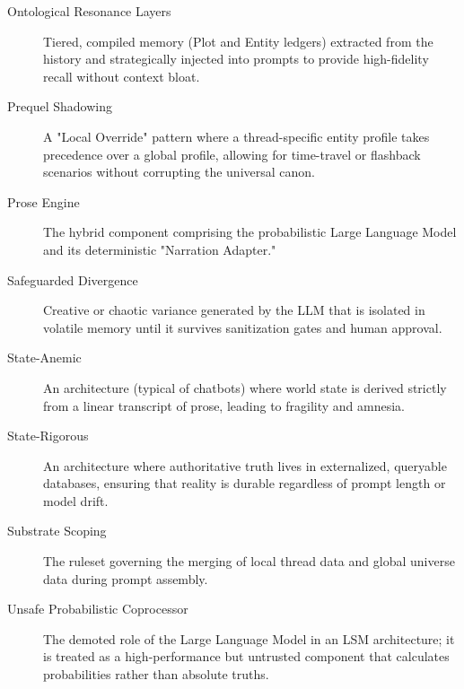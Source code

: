 \documentclass[12pt, a4paper]{article}
\begin{document}
\begin{description}
    \item[Ontological Resonance Layers] \label{def:resonance}
    Tiered, compiled memory (Plot and Entity ledgers) extracted from the history and strategically injected into prompts to provide high-fidelity recall without context bloat.

    \item[Prequel Shadowing] \label{def:shadow}
    A "Local Override" pattern where a thread-specific entity profile takes precedence over a global profile, allowing for time-travel or flashback scenarios without corrupting the universal canon.

    \item[Prose Engine] \label{def:prose}
    The hybrid component comprising the probabilistic Large Language Model and its deterministic "Narration Adapter."

    \item[Safeguarded Divergence] \label{def:safeguard}
    Creative or chaotic variance generated by the LLM that is isolated in volatile memory until it survives sanitization gates and human approval.

    \item[State-Anemic] \label{def:anemic}
    An architecture (typical of chatbots) where world state is derived strictly from a linear transcript of prose, leading to fragility and amnesia.

    \item[State-Rigorous] \label{def:rigorous}
    An architecture where authoritative truth lives in externalized, queryable databases, ensuring that reality is durable regardless of prompt length or model drift.

    \item[Substrate Scoping] \label{def:substrate}
    The ruleset governing the merging of local thread data and global universe data during prompt assembly.

    \item[Unsafe Probabilistic Coprocessor] \label{def:coprocessor}
    The demoted role of the Large Language Model in an LSM architecture; it is treated as a high-performance but untrusted component that calculates probabilities rather than absolute truths.

\end{description}
\end{document}

